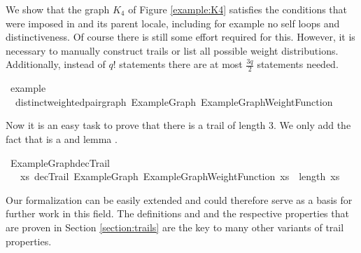 \begin{isabellebody}
%
\isadelimproof
%
\endisadelimproof
%
\isatagproof
%
\endisatagproof
{\isafoldproof}%
%
\isadelimproof
%
\endisadelimproof
%
\isadelimproof
%
\endisadelimproof
%
\isatagproof
%
\endisatagproof
{\isafoldproof}%
%
\isadelimproof
%
\endisadelimproof
%
\isadelimproof
%
\endisadelimproof
%
\isatagproof
%
\endisatagproof
{\isafoldproof}%
%
\isadelimproof
%
\endisadelimproof
%
\begin{isamarkuptext}%
We show that the graph $K_4$ of Figure \ref{example:K4} satisfies the conditions that were
imposed in 
 and its parent locale, including for example no self loops 
and distinctiveness. Of course there is still some effort required for this. However, it is necessary
to manually construct trails or list all possible weight distributions. Additionally, instead of 
$q!$ statements there are at most $\frac{3q}{2}$ statements needed.%
\end{isamarkuptext}\isamarkuptrue%
\isamarkupfalse%
\ example{\isacharcolon}\ \isanewline
\ \ distinct{\isacharunderscore}weighted{\isacharunderscore}pair{\isacharunderscore}graph\ ExampleGraph\ ExampleGraphWeightFunction%
\isadelimproof
%
\endisadelimproof
%
\isatagproof
%
\endisatagproof
{\isafoldproof}%
%
\isadelimproof
%
\endisadelimproof
%
\begin{isamarkuptext}%
Now it is an easy task to prove that there is a trail of length 3. We only add the fact that
 is a  and lemma .%
\end{isamarkuptext}\isamarkuptrue%
\isamarkupfalse%
\ ExampleGraph{\isacharunderscore}decTrail{\isacharcolon}\isanewline
\ \ {\isachardoublequoteopen}{\isasymexists}\ xs{\isachardot}\ decTrail\ ExampleGraph\ ExampleGraphWeightFunction\ xs\ {\isasymand}\ length\ xs\ {\isacharequal}\ {}{\isachardoublequoteclose}%
\isadelimproof
%
\endisadelimproof
%
\isatagproof
%
\endisatagproof
{\isafoldproof}%
%
\isadelimproof
%
\endisadelimproof
%
\isadelimdocument
%
\endisadelimdocument
%
\isatagdocument
%
\isamarkuptrue%
%
\endisatagdocument
{\isafolddocument}%
%
\isadelimdocument
%
\endisadelimdocument
%
\begin{isamarkuptext}%
Our formalization can be easily extended and could therefore serve as a basis for further work in this field.
The definitions  and  and the respective properties that are proven in 
Section \ref{section:trails} are the key to many other variants of trail properties. 


\end{isamarkuptext}
\end{isabellebody}
